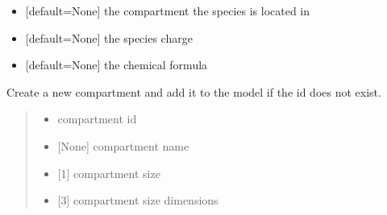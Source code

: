 \documentclass[letterpaper,12pt,english]{sphinxmanual}
\begin{document}
\begin{fulllineitems}
\begin{fulllineitems}
\begin{itemize}
\item {} 
\sphinxAtStartPar
{} {[}default=None{]} the compartment the species is located in

\item {} 
\sphinxAtStartPar
{} {[}default=None{]} the species charge

\item {} 
\sphinxAtStartPar
{} {[}default=None{]} the chemical formula

\end{itemize}

\end{fulllineitems}


\begin{fulllineitems}
\label{\detokenize{api/core:cbmpy.CBModel.Model.createCompartment}}
\pysigstartsignatures
\pysiglinewithargsret
{}
{\sphinxparamcomma {}\sphinxparamcomma {}\sphinxparamcomma {}\sphinxparamcomma {}}
{}
\pysigstopsignatures
\sphinxAtStartPar
Create a new compartment and add it to the model if the id does not exist.
\begin{quote}\begin{description}
\begin{itemize}
\item {} 
\sphinxAtStartPar
{} \textendash{} compartment id

\item {} 
\sphinxAtStartPar
{} \textendash{} {[}None{]} compartment name

\item {} 
\sphinxAtStartPar
{} \textendash{} {[}1{]} compartment size

\item {} 
\sphinxAtStartPar
{} \textendash{} {[}3{]} compartment size dimensions


\end{itemize}
\end{description}
\end{quote}
\end{fulllineitems}
\end{fulllineitems}
\end{document}
